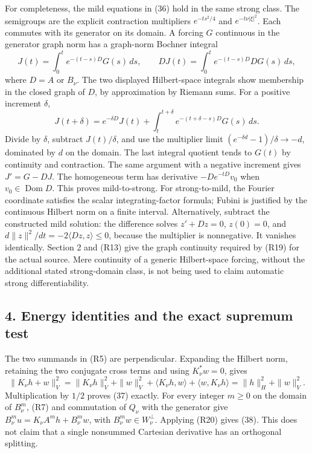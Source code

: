 For completeness, the mild equations in (36) hold in the same strong class. The semigroups are the explicit contraction multipliers \(e^{-ts^2/4}\) and \(e^{-t\nu|\xi|^2}\). Each commutes with its generator on its domain. A forcing \(G\) continuous in the generator graph norm has a graph-norm Bochner integral \[
J(t)=\int_0^te^{-(t-s)D}G(s)\,ds,
\qquad DJ(t)=\int_0^te^{-(t-s)D}DG(s)\,ds,
\tag{R19}
\] where \(D=A\) or \(B_\nu\). The two displayed Hilbert-space integrals show membership in the closed graph of \(D\), by approximation by Riemann sums. For a positive increment \(\delta\), \[
J(t+\delta)=e^{-\delta D}J(t)
+\int_t^{t+\delta}e^{-(t+\delta-s)D}G(s)\,ds.
\] Divide by \(\delta\), subtract \(J(t)/\delta\), and use the multiplier limit \((e^{-\delta d}-1)/\delta\to-d\), dominated by \(d\) on the domain. The last integral quotient tends to \(G(t)\) by continuity and contraction. The same argument with a negative increment gives \(J'=G-DJ\). The homogeneous term has derivative \(-De^{-tD}v_0\) when \(v_0\in\operatorname{Dom}D\). This proves mild-to-strong. For strong-to-mild, the Fourier coordinate satisfies the scalar integrating-factor formula; Fubini is justified by the continuous Hilbert norm on a finite interval. Alternatively, subtract the constructed mild solution: the difference solves \(z'+Dz=0\), \(z(0)=0\), and \(d\|z\|^2/dt=-2\langle Dz,z\rangle\le0\), because the multiplier is nonnegative. It vanishes identically. Section 2 and (R13) give the graph continuity required by (R19) for the actual source. Mere continuity of a generic Hilbert-space forcing, without the additional stated strong-domain class, is not being used to claim automatic strong differentiability.

\subsection*{4. Energy identities and the exact supremum test}

The two summands in (R5) are perpendicular. Expanding the Hilbert norm, retaining the two conjugate cross terms and using \(K_\nu^*w=0\), gives \[
\|K_\nu h+w\|_V^2
=\|K_\nu h\|_V^2+\|w\|_V^2
+\langle K_\nu h,w\rangle+\langle w,K_\nu h\rangle
=\|h\|_H^2+\|w\|_V^2.
\tag{R20}
\] Multiplication by \(1/2\) proves (37) exactly. For every integer \(m\ge0\) on the domain of \(B_\nu^m\), (R7) and commutation of \(Q_\nu\) with the generator give \(B_\nu^mu=K_\nu A^mh+B_\nu^mw\), with \(B_\nu^mw\in W_\nu^\perp\). Applying (R20) gives (38). This does not claim that a single nonsummed Cartesian derivative has an orthogonal splitting.

